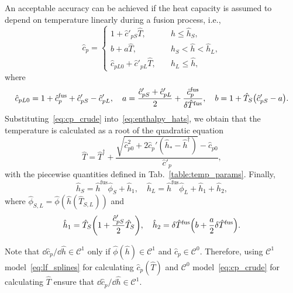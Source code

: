 \documentclass{article}
\newcommand{\fusion}[1]{{#1}^\mathrm{fus}}
\begin{document}
An acceptable accuracy can be achieved if the heat capacity is assumed
to depend on temperature linearly during a fusion process, i.e.,
\begin{equation}\label{eq:cp_crude}
	\hat{c}_p = \begin{cases}
        1 + \hat{c}'_{pS}\hat{T},             & \quad \hat{h} \leq \hat{h}_S, \\
        b + a\hat{T},                         & \quad \hat{h}_S < \hat{h} < \hat{h}_L, \\
        \hat{c}_{pL0} + \hat{c}'_{pL}\hat{T}, & \quad \hat{h}_L \leq \hat{h},
    \end{cases}
\end{equation}
where
\begin{equation*}
	\hat{c}_{pL0} = 1 + \fusion{\hat{c}_p} + \hat{c}'_{pS} - \hat{c}'_{pL}, \quad
	a = \frac{\hat{c}'_{pS} + \hat{c}'_{pL}}2 + \frac{\fusion{\hat{c}_p}}{\delta\fusion{\hat{T}}}, \quad
	b = 1 + \hat{T}_S\qty(\hat{c}'_{pS} - a).
\end{equation*}
Substituting~\eqref{eq:cp_crude} into~\eqref{eq:enthalpy_hats},
we obtain that the temperature is calculated as a root of the quadratic equation
\begin{equation}\label{eq:temp_crude}
	\hat{T} = \hat{T}^\dag + \frac{\sqrt{\hat{c}_{p0}^2 + 2\hat{c}_p'(\hat{h}_* - \hat{h}^\dag) } - \hat{c}_{p0}}{\hat{c}'_p},
\end{equation}
with the piecewise quantities defined in Tab.~\ref{table:temp_params}. Finally,
\begin{equation}\label{eq:enthalpySL_crude}
	\hat{h}_S = \fusion{\hat{h}}\hat{\phi}_S + \hat{h}_1, \quad \hat{h}_L = \fusion{\hat{h}}\hat{\phi}_L + \hat{h}_1 + \hat{h}_2,
\end{equation}
where \(\hat{\phi}_{S,L} = \hat{\phi}(\hat{h}(\hat{T}_{S,L}))\) and
\begin{equation*}
	\hat{h}_1 = \hat{T}_S\qty(1 + \frac{\hat{c}'_{pS}}2\hat{T}_S), \quad
	\hat{h}_2 = \delta\fusion{\hat{T}}\qty(b + \frac{a}2\delta\fusion{\hat{T}}).
\end{equation*}

Note that \(\dd\hat{c}_p/\dd\hat{h}\in\mathcal{C}^1\)
only if \(\hat{\phi}(\hat{h})\in\mathcal{C}^1\) and \(\hat{c}_p\in\mathcal{C}^0\).
Therefore, using \(\mathcal{C}^1\) model~\eqref{eq:lf_splines} for calculating \(\hat{c}_p(\hat{T})\)
and \(\mathcal{C}^0\) model~\eqref{eq:cp_crude} for calculating \(\hat{T}\)
ensure that \(\dd\hat{c}_p/\dd\hat{h}\in\mathcal{C}^1\).
\end{document}
